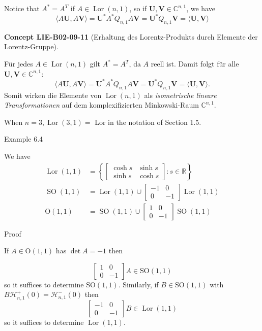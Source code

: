 \documentclass[10pt, letterpaper]{article}
\newcommand{\CustomHeading}[3]{%
  \par\medskip\noindent%
  \textbf{#1 #2} \textnormal{(#3)}.\enskip%
}
\newenvironment{CONC}[2]{\begin{unitbox}\CustomHeading{Concept}{#1}{#2}}{\end{unitbox}}
\begin{document}
Notice that $A^{*}=A^{T}$ if $A \in \operatorname{Lor}(n, 1)$, so if $\mathbf{U}, \mathbf{V} \in \mathbb{C}^{n, 1}$, we have
$$
\langle A \mathbf{U}, A \mathbf{V}\rangle=\mathbf{U}^{*} A^{*} Q_{n, 1} A \mathbf{V}=\mathbf{U}^{*} Q_{n, 1} \mathbf{V}=\langle\mathbf{U}, \mathbf{V}\rangle
$$


\begin{CONC}{LIE-B02-09-11}{Erhaltung des Lorentz-Produkts durch Elemente der Lorentz-Gruppe}
Für jedes \(A\in \operatorname{Lor}(n,1)\) gilt \(A^{*}=A^{T}\), da \(A\) reell ist.
Damit folgt für alle \(\mathbf{U},\mathbf{V}\in \mathbb{C}^{n,1}\):
\[
\langle A\mathbf{U},A\mathbf{V}\rangle
=\mathbf{U}^{*}A^{*}Q_{n,1}A\mathbf{V}
=\mathbf{U}^{*}Q_{n,1}\mathbf{V}
=\langle \mathbf{U},\mathbf{V}\rangle.
\]
Somit wirken die Elemente von \(\operatorname{Lor}(n,1)\) als
\emph{isometrische lineare Transformationen} auf dem komplexifizierten
Minkowski-Raum \(\mathbb{C}^{n,1}\).
\end{CONC}



When $n=3, \operatorname{Lor}(3,1)=$ Lor in the notation of Section 1.5.



Example 6.4


We have
$$
\begin{aligned}
\operatorname{Lor}(1,1) & =\left\{\left[\begin{array}{cc}
\cosh s & \sinh s \\
\sinh s & \cosh s
\end{array}\right]: s \in \mathbb{R}\right\} \\
\operatorname{SO}(1,1) & =\operatorname{Lor}(1,1) \cup\left[\begin{array}{rr}
-1 & 0 \\
0 & -1
\end{array}\right] \operatorname{Lor}(1,1) \\
\mathrm{O}(1,1) & =\operatorname{SO}(1,1) \cup\left[\begin{array}{rr}
1 & 0 \\
0 & -1
\end{array}\right] \operatorname{SO}(1,1)
\end{aligned}
$$


Proof


If $A \in \mathrm{O}(1,1)$ has $\operatorname{det} A=-1$ then

$$
\left[\begin{array}{rr}
1 & 0 \\
0 & -1
\end{array}\right] A \in \mathrm{SO}(1,1)
$$
so it suffices to determine $\mathrm{SO}(1,1)$. Similarly, if $B \in \mathrm{SO}(1,1)$ with $B \mathcal{H}_{n, 1}^{+}(0)= \mathcal{H}_{n, 1}^{-}(0)$ then
$$
\left[\begin{array}{rr}
-1 & 0 \\
0 & -1
\end{array}\right] B \in \operatorname{Lor}(1,1)
$$
so it suffices to determine $\operatorname{Lor}(1,1)$.
\end{document}
